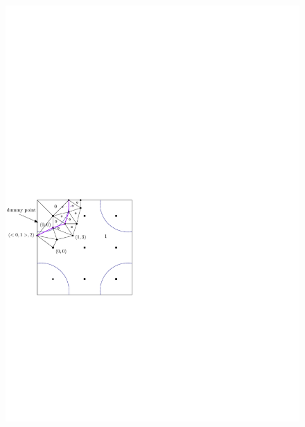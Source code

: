 \documentclass[a4paper,11pt]{article}
\begin{document}
\begin{figure}[h!]
\centerline{\includegraphics[scale=1]{fig/refinement.pdf}}
\caption{\label{}}
\end{figure}
\end{document}
